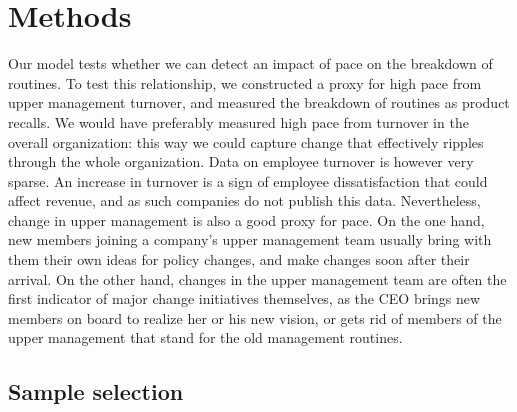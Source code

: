\section{Methods}

Our model tests whether we can detect an impact of pace on the breakdown of routines. To test this relationship, we constructed a proxy for high pace from upper management turnover, and measured the breakdown of routines as product recalls. We would have preferably measured high pace from turnover in the overall organization: this way we could capture change that effectively ripples through the whole organization. Data on employee turnover is however very sparse. An increase in turnover is a sign of employee dissatisfaction that could affect revenue, and as such companies do not publish this data. Nevertheless, change in upper management is also a good proxy for pace. On the one hand, new members joining a company's upper management team usually bring with them their own ideas for policy changes, and make changes soon after their arrival. On the other hand, changes in the upper management team are often the first indicator of major change initiatives themselves, as the CEO brings new members on board to realize her or his new vision, or gets rid of members of the upper management that stand for the old management routines.

\subsection{Sample selection}

